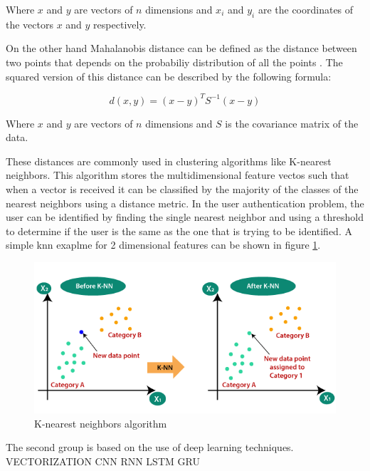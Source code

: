 Where $x$ and $y$ are vectors of $n$ dimensions and $x_i$ and $y_i$ are the coordinates of the vectors $x$ and $y$ respectively.

On the other hand Mahalanobis distance can be defined as the distance between two points that depends on the probabiliy distribution of all the points \cite{de2000mahalanobis}. The squared version of this distance can be described by the following formula:

\begin{equation}
	d(x,y) = (x-y)^T S^{-1} (x-y)
\end{equation}

Where $x$ and $y$ are vectors of $n$ dimensions and $S$ is the covariance matrix of the data.


These distances are commonly used in clustering algorithms like K-nearest neighbors. This algorithm stores the multidimensional feature vectos such that when a vector is received it can be classified by the majority of the classes of the nearest neighbors using a distance metric. In the user authentication problem, the user can be identified by finding the single nearest neighbor and using a threshold to determine if the user is the same as the one that is trying to be identified. A simple knn exaplme for 2 dimensional features can be shown in figure \ref{fig:knn}.

\begin{figure}[h]
    \centering
    \includegraphics[width=0.7\linewidth]{images/knn}
    \caption{K-nearest neighbors algorithm \cite{knn}}
    \label{fig:knn}
\end{figure}

The second group is based on the use of deep learning techniques. 
VECTORIZATION
CNN
RNN
LSTM
GRU

